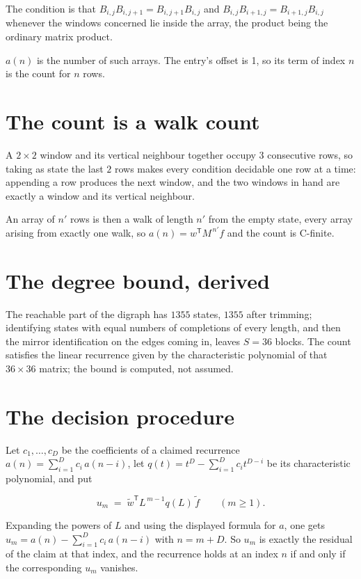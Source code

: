 \documentclass[11pt]{article}
\theoremstyle{definition}
\begin{document}
The condition is that $B_{i,j}B_{i,j+1} = B_{i,j+1}B_{i,j}$ and $B_{i,j}B_{i+1,j} = B_{i+1,j}B_{i,j}$ whenever the windows concerned lie inside the array, the product being the ordinary matrix product.

$a(n)$ is the number of such arrays. The entry's offset is 1, so its term of index $n$ is the count for $n$ rows.

\section{The count is a walk count}

A $2\times2$ window and its vertical neighbour together occupy $3$ consecutive rows, so taking as state the last $2$ rows makes every condition decidable one row at a time: appending a row produces the next window, and the two windows in hand are exactly a window and its vertical neighbour.

An array of $n'$ rows is then a walk of length $n'$ from the empty state, every array arising from exactly one walk, so $a(n) = w^{\mathsf T}M^{\,n'}f$ and the count is C-finite.

\section{The degree bound, derived}

The reachable part of the digraph has $1355$ states, $1355$ after trimming; identifying states with equal numbers of completions of every length, and then the mirror identification on the edges coming in, leaves $S = 36$ blocks. The count satisfies the linear recurrence given by the characteristic polynomial of that $36\times36$ matrix; the bound is computed, not assumed.

\section{The decision procedure}

Let $c_1,\dots,c_D$ be the coefficients of a claimed recurrence $a(n) = \sum_{i=1}^{D} c_i\,a(n-i)$, let $q(t) = t^{D} - \sum_{i=1}^{D} c_i t^{D-i}$ be its characteristic polynomial, and put

\[u_m \;=\; \tilde w^{\mathsf T} L^{\,m-1} q(L)\,\tilde f \qquad (m \ge 1).\]

Expanding the powers of $L$ and using the displayed formula for $a$, one gets $u_m = a(n) - \sum_{i=1}^{D} c_i\,a(n-i)$ with $n = m + D$. So $u_m$ is exactly the residual of the claim at that index, and the recurrence holds at an index $n$ if and only if the corresponding $u_m$ vanishes.
\end{document}
